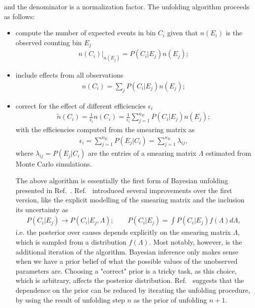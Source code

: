 %
and the denominator is a normalization factor.
The unfolding algorithm proceeds as follows:
\begin{itemize}
\item
compute the number of expected events in bin $C_i$ given that $n(E_i)$ is the observed counting bin $E_j$\\
\begin{align}
n(C_i)|_{n(E_j)} = P(C_i | E_j) n(E_j);
\end{align}
\item
include effects from all observations\\
\begin{align}
n(C_i) = \sum_j P(C_i | E_j) n(E_j);
\end{align}
\item
correct for the effect of different efficiencies $\epsilon_i$\\
\begin{align}
\tilde{n}(C_i) = \frac{1}{\epsilon_i} n(C_i) = \frac{1}{\epsilon_i}\sum_{j=1}^{n_E} P(C_i | E_j) n(E_j);
\end{align}
with the efficiencies computed from the smearing matrix as
\begin{align}
\epsilon_i = \sum_{j=1}^{n_E} P(E_j | C_i) = \sum_{j=1}^{n_E} \lambda_{ij},
\end{align}
where $\lambda_{ij} = P(E_j | C_i)$ are the entries of a smearing matrix $\Lambda$ estimated from Monte Carlo simulations. 

The above algorithm is essentially the first form of Bayesian unfolding presented in Ref.~\cite{DAgostini:1994fjx}. Ref.~\cite{dagostini2010improved} introduced several improvements over the first version, like the explicit modelling of the smearing matrix and the inclusion its uncertainty as
%
\begin{align}
P(C_i | E_j) \longrightarrow P(C_i | E_j, \Lambda); \qquad P(C_i | E_j) = \int P(C_i | E_j) f(\Lambda) d\Lambda,
\end{align}
%
i.e. the posterior over causes depends explicitly on the smearing matrix $\Lambda$, which is sampled from a distribution $f(\Lambda)$.
Most notably, however, is the additional iteration of the algorithm. Bayesian inference only makes sense when we have a prior belief of what the possible values of the unobserved parameters are. Choosing a "correct" prior is a tricky task, as this choice, which is arbitrary, affects the posterior distribution.
Ref.~\cite{dagostini2010improved} suggests that the dependence on the prior can be reduced by iterating the unfolding procedure, by using the result of unfolding step $n$ as the prior of unfolding $n+1$.


\end{itemize}
